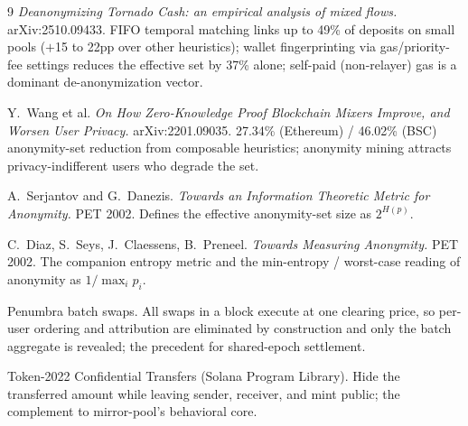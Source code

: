 \documentclass[10pt]{article}
\begin{document}
\begin{thebibliography}{9}
\small
{} \emph{Deanonymizing Tornado Cash: an empirical analysis of
mixed flows.} arXiv:2510.09433. FIFO temporal matching links up to 49\% of
deposits on small pools ($+$15 to 22pp over other heuristics); wallet
fingerprinting via gas/priority-fee settings reduces the effective set by 37\%
alone; self-paid (non-relayer) gas is a dominant de-anonymization vector.

 Y.\ Wang et al. \emph{On How Zero-Knowledge Proof Blockchain
Mixers Improve, and Worsen User Privacy.} arXiv:2201.09035. 27.34\% (Ethereum) /
46.02\% (BSC) anonymity-set reduction from composable heuristics; anonymity
mining attracts privacy-indifferent users who degrade the set.

 A.\ Serjantov and G.\ Danezis. \emph{Towards an Information
Theoretic Metric for Anonymity.} PET 2002. Defines the effective anonymity-set
size as $2^{H(p)}$.

 C.\ Diaz, S.\ Seys, J.\ Claessens, B.\ Preneel. \emph{Towards
Measuring Anonymity.} PET 2002. The companion entropy metric and the min-entropy
/ worst-case reading of anonymity as $1/\max_i p_i$.

 Penumbra batch swaps. All swaps in a block execute at one
clearing price, so per-user ordering and attribution are eliminated by
construction and only the batch aggregate is revealed; the precedent for
shared-epoch settlement.

 Token-2022 Confidential Transfers (Solana Program Library).
Hide the transferred amount while leaving sender, receiver, and mint public; the
complement to mirror-pool's behavioral core.
\end{thebibliography}
\end{document}
